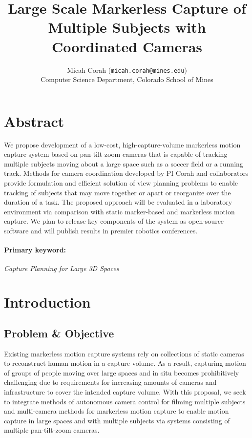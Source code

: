 \documentclass[11pt]{article}
\title{Large Scale Markerless Capture of Multiple Subjects
with Coordinated Cameras}
\author{Micah Corah (\texttt{micah.corah@mines.edu})
  \\
  Computer Science Department,
  Colorado School of Mines
}
\date{}
\begin{document}
\maketitle

\section{Abstract}


We propose development of a low-cost, high-capture-volume markerless motion
capture system based on pan-tilt-zoom cameras that is capable of tracking
multiple subjects moving about a large space such as a soccer field or a running
track.
Methods for camera coordination developed by PI Corah and collaborators provide
formulation and efficient solution of view planning problems to enable tracking
of subjects that may move together or apart or reorganize over the duration of a
task.
The proposed approach will be evaluated in a laboratory environment via
comparison with static marker-based and markerless motion capture.
We plan to release key components of the system as open-source software and will
publish results in premier robotics conferences.

\paragraph{Primary keyword:}
\emph{Capture Planning for Large 3D Spaces}

\section{Introduction}

\subsection{Problem \& Objective}

Existing markerless motion capture systems rely on collections of static cameras
to reconstruct human motion in a capture volume.
As a result, capturing motion of groups of people moving over large spaces and
in situ becomes prohibitively challenging due to requirements for increasing
amounts of cameras and infrastructure to cover the intended capture volume.
With this proposal, we seek to integrate methods of autonomous camera control
for filming multiple subjects and multi-camera methods for markerless motion
capture to enable motion capture in large spaces and with multiple subjects via
systems consisting of multiple pan-tilt-zoom cameras.
\end{document}

